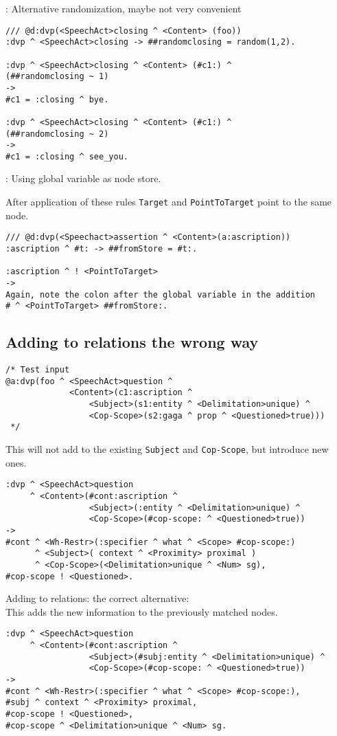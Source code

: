\newpage{}: Alternative randomization, maybe not very convenient
\begin{verbatim}
/// @d:dvp(<SpeechAct>closing ^ <Content> (foo))
:dvp ^ <SpeechAct>closing -> ##randomclosing = random(1,2).

:dvp ^ <SpeechAct>closing ^ <Content> (#c1:) ^
(##randomclosing ~ 1)
->
#c1 = :closing ^ bye.

:dvp ^ <SpeechAct>closing ^ <Content> (#c1:) ^
(##randomclosing ~ 2)
->
#c1 = :closing ^ see_you.
\end{verbatim}

: Using global variable as node store.

After application of these rules \texttt{Target} and \texttt{PointToTarget}
point to the same node.

\begin{verbatim}
/// @d:dvp(<Speechact>assertion ^ <Content>(a:ascription))
:ascription ^ #t: -> ##fromStore = #t:.

:ascription ^ ! <PointToTarget>
->
Again, note the colon after the global variable in the addition
# ^ <PointToTarget> ##fromStore:.
\end{verbatim}


\subsection{
 Adding to relations the wrong way
}

\begin{verbatim}
/* Test input
@a:dvp(foo ^ <SpeechAct>question ^
             <Content>(c1:ascription ^
                 <Subject>(s1:entity ^ <Delimitation>unique) ^
                 <Cop-Scope>(s2:gaga ^ prop ^ <Questioned>true)))
 */
\end{verbatim}

This will not add to the existing \texttt{Subject} and \texttt{Cop-Scope},
but introduce new ones.
\begin{verbatim}
:dvp ^ <SpeechAct>question
     ^ <Content>(#cont:ascription ^
                 <Subject>(:entity ^ <Delimitation>unique) ^
                 <Cop-Scope>(#cop-scope: ^ <Questioned>true))
->
#cont ^ <Wh-Restr>(:specifier ^ what ^ <Scope> #cop-scope:)
      ^ <Subject>( context ^ <Proximity> proximal )
      ^ <Cop-Scope>(<Delimitation>unique ^ <Num> sg),
#cop-scope ! <Questioned>.
\end{verbatim}

\newpage Adding to relations: the correct alternative:\\
This adds the new information to the previously matched nodes.
\begin{verbatim}
:dvp ^ <SpeechAct>question
     ^ <Content>(#cont:ascription ^
                 <Subject>(#subj:entity ^ <Delimitation>unique) ^
                 <Cop-Scope>(#cop-scope: ^ <Questioned>true))
->
#cont ^ <Wh-Restr>(:specifier ^ what ^ <Scope> #cop-scope:),
#subj ^ context ^ <Proximity> proximal,
#cop-scope ! <Questioned>,
#cop-scope ^ <Delimitation>unique ^ <Num> sg.
\end{verbatim}

